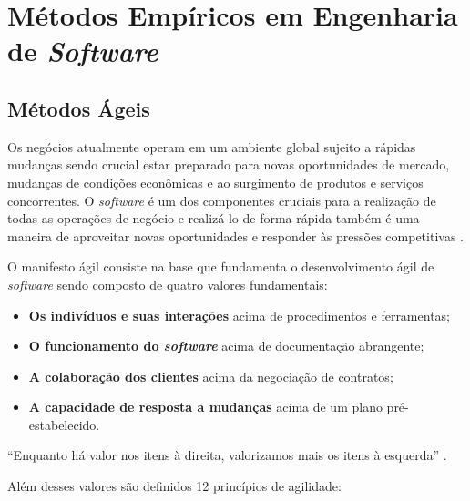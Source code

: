 \chapter{Métodos Empíricos em Engenharia de \textit{Software}}

\section{Métodos Ágeis}
Os negócios atualmente operam em um ambiente global sujeito a rápidas mudanças sendo crucial
estar preparado para novas oportunidades de mercado, mudanças de condições econômicas e ao surgimento
de produtos e serviços concorrentes. O \textit{software} é um dos componentes cruciais para a realização
de todas as operações de negócio e realizá-lo de forma rápida também é uma maneira de aproveitar novas
oportunidades e responder às pressões competitivas \cite{sommerville_2006}.

O manifesto ágil \cite{beck2001agile} consiste na base que fundamenta o desenvolvimento ágil de
\textit{software} sendo composto de quatro valores fundamentais:

\begin{itemize}
    \item \textbf{Os indivíduos e suas interações} acima de procedimentos e ferramentas;
    \item \textbf{O funcionamento do \textit{software}} acima de documentação abrangente;
    \item \textbf{A colaboração dos clientes} acima da negociação de contratos;
    \item \textbf{A capacidade de resposta a mudanças} acima de um plano pré-estabelecido.
\end{itemize}

``Enquanto há valor nos itens à direita, valorizamos mais os itens à esquerda'' \cite{beck2001agile}.

Além desses valores são definidos 12 princípios de agilidade:

